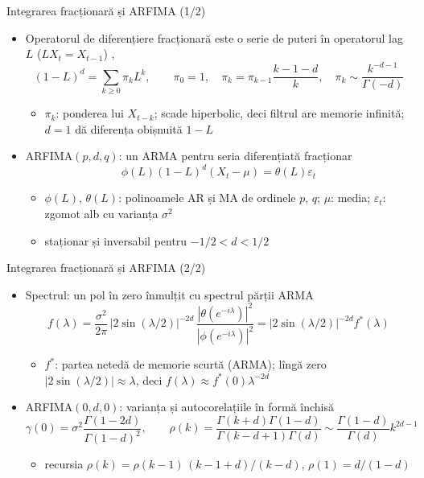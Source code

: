 \begin{frame}{Integrarea fracționară și ARFIMA (1/2)}
\itemsize{\small}
\begin{itemize}
    \item Operatorul de diferențiere fracționară este o serie de puteri în operatorul lag $L$ ($LX_t = X_{t-1}$) , 
    \[ (1 - L)^d = \sum_{k\ge0}\pi_k L^k, \qquad \pi_0 = 1, \quad \pi_k = \pi_{k-1}\frac{k - 1 - d}{k}, \quad \pi_k \sim \frac{k^{-d-1}}{\Gamma(-d)} \]
    \begin{itemize}
        \item $\pi_k$: ponderea lui $X_{t-k}$; scade hiperbolic, deci filtrul are memorie infinită; $d = 1$ dă diferența obișnuită $1 - L$
    \end{itemize}
    \item ARFIMA$(p,d,q)$: un ARMA pentru seria diferențiată fracționar
    \[ \phi(L)(1 - L)^d(X_t - \mu) = \theta(L)\varepsilon_t \]
    \begin{itemize}
        \item $\phi(L)$, $\theta(L)$: polinoamele AR și MA de ordinele $p$, $q$; $\mu$: media; $\varepsilon_t$: zgomot alb cu varianța $\sigma^2$
        \item staționar și inversabil pentru $-1/2 < d < 1/2$
    \end{itemize}
\end{itemize}
\end{frame}

\begin{frame}{Integrarea fracționară și ARFIMA (2/2)}
\itemsize{\small}
\begin{itemize}
    \item Spectrul: un pol în zero înmulțit cu spectrul părții ARMA
    \[ f(\lambda) = \frac{\sigma^2}{2\pi}\,\big|2\sin(\lambda/2)\big|^{-2d}\,\frac{|\theta(e^{-i\lambda})|^2}{|\phi(e^{-i\lambda})|^2} = |2\sin(\lambda/2)|^{-2d}f^*(\lambda) \]
    \begin{itemize}
        \item $f^*$: partea netedă de memorie scurtă (ARMA); lîngă zero $|2\sin(\lambda/2)| \approx \lambda$, deci $f(\lambda) \approx f^*(0)\lambda^{-2d}$
    \end{itemize}
    \item ARFIMA$(0,d,0)$: varianța și autocorelațiile în formă închisă
    \[ \gamma(0) = \sigma^2\frac{\Gamma(1 - 2d)}{\Gamma(1 - d)^2}, \qquad \rho(k) = \frac{\Gamma(k + d)\Gamma(1 - d)}{\Gamma(k - d + 1)\Gamma(d)} \sim \frac{\Gamma(1 - d)}{\Gamma(d)}k^{2d-1} \]
    \begin{itemize}
        \item recursia $\rho(k) = \rho(k - 1)\,(k - 1 + d)/(k - d)$, $\rho(1) = d/(1 - d)$
    \end{itemize}
\end{itemize}
\end{frame}

